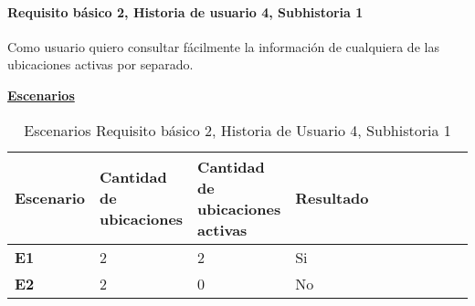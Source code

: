 \documentclass[../ei103948-project-documentation.tex]{subfiles}
\begin{document}
					\paragraph*{Requisito básico 2, Historia de usuario 4, Subhistoria 1}
					Como usuario quiero consultar fácilmente la información de cualquiera de las ubicaciones activas por separado.
						\begin{center}
							\textbf{\underline{Escenarios}}
							\begin{table}[H]
								\centering
								\begin{tabular}{|p{0.14\linewidth}|p{0.20\linewidth}|p{0.20\linewidth}|p{0.20\linewidth}|p{0.12\linewidth}|p{0.12\linewidth}|p{0.12\linewidth}|}
									\hline
									\textbf{Escenario} & \textbf{Cantidad de ubicaciones} & \textbf{Cantidad de ubicaciones activas} & \textbf{Resultado} \\ \hline
									\textbf{E1}        & 2                                & 2                                        & Si                 \\ \hline
									\textbf{E2}        & 2                                & 0                                        & No                 \\ \hline
									\end{tabular}
								\caption{Escenarios Requisito básico 2, Historia de Usuario 4, Subhistoria 1}
							\end{table}

							\newpage

							\descripcionBasicaP


\end{center}
\end{document}
